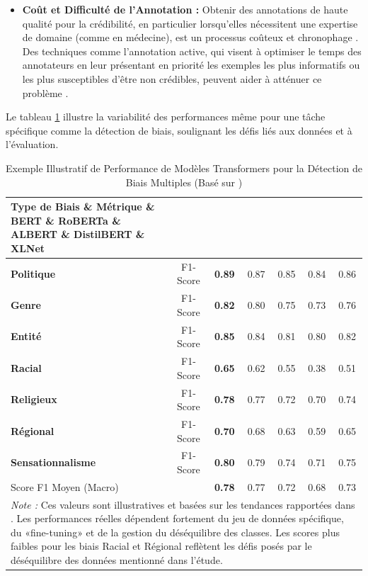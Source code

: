 \documentclass[9pt,twocolumn,french]{article}
\begin{document}
\begin{itemize}
    \item \textbf{Coût et Difficulté de l'Annotation :} Obtenir des annotations de haute qualité pour la crédibilité, en particulier lorsqu'elles nécessitent une expertise de domaine (comme en médecine), est un processus coûteux et chronophage \citep{Hagag2023The, Pescuma2025, Thibault2025A}. Des techniques comme l'annotation active, qui visent à optimiser le temps des annotateurs en leur présentant en priorité les exemples les plus informatifs ou les plus susceptibles d'être non crédibles, peuvent aider à atténuer ce problème \citep{Hagag2023The, Nabozny2021}.
\end{itemize}

Le tableau \ref{tab:bias_detection_perf} illustre la variabilité des performances même pour une tâche spécifique comme la détection de biais, soulignant les défis liés aux données et à l'évaluation.

\begin{table}[htbp]
  \centering
  \caption{Exemple Illustratif de Performance de Modèles Transformers pour la Détection de Biais Multiples (Basé sur \citep{Shah2024Decoding})}
  \label{tab:bias_detection_perf}
  \begin{tabular}{@{}lcccccc@{}}
    \toprule
    Type de Biais \& Métrique \& BERT \& RoBERTa \& ALBERT \& DistilBERT \& XLNet \\
    \midrule
    \textbf{Politique} & F1-Score & \textbf{0.89} & 0.87 & 0.85 & 0.84 & 0.86 \\
    \textbf{Genre} & F1-Score & \textbf{0.82} & 0.80 & 0.75 & 0.73 & 0.76 \\
    \textbf{Entité} & F1-Score & \textbf{0.85} & 0.84 & 0.81 & 0.80 & 0.82 \\
    \textbf{Racial} & F1-Score & \textbf{0.65} & 0.62 & 0.55 & 0.38 & 0.51 \\
    \textbf{Religieux} & F1-Score & \textbf{0.78} & 0.77 & 0.72 & 0.70 & 0.74 \\
    \textbf{Régional} & F1-Score & \textbf{0.70} & 0.68 & 0.63 & 0.59 & 0.65 \\
    \textbf{Sensationnalisme} & F1-Score & \textbf{0.80} & 0.79 & 0.74 & 0.71 & 0.75 \\
    \midrule
    \multicolumn{2}{l}{Score F1 Moyen (Macro)} & \textbf{0.78} & 0.77 & 0.72 & 0.68 & 0.73 \\
    \bottomrule
    \multicolumn{7}{p{0.9\linewidth}}{\footnotesize \textit{Note :} Ces valeurs sont illustratives et basées sur les tendances rapportées dans \citep{Shah2024Decoding}. Les performances réelles dépendent fortement du jeu de données spécifique, du «fine-tuning» et de la gestion du déséquilibre des classes. Les scores plus faibles pour les biais Racial et Régional reflètent les défis posés par le déséquilibre des données mentionné dans l'étude.} \\
  \end{tabular}
\end{table}
\end{document}
